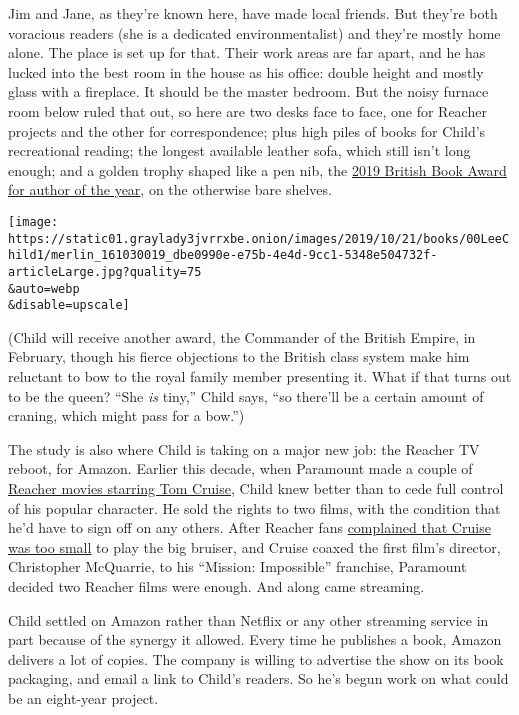 Jim and Jane, as they're known here, have made local friends. But
they're both voracious readers (she is a dedicated environmentalist) and
they're mostly home alone. The place is set up for that. Their work
areas are far apart, and he has lucked into the best room in the house
as his office: double height and mostly glass with a fireplace. It
should be the master bedroom. But the noisy furnace room below ruled
that out, so here are two desks face to face, one for Reacher projects
and the other for correspondence; plus high piles of books for Child's
recreational reading; the longest available leather sofa, which still
isn't long enough; and a golden trophy shaped like a pen nib, the
\href{https://www.thebookseller.com/british-book-awards/2019-author-year}{2019
British Book Award for author of the year}, on the otherwise bare
shelves.

\texttt{[image: https://static01.graylady3jvrrxbe.onion/images/2019/10/21/books/00LeeChild1/merlin\_161030019\_dbe0990e-e75b-4e4d-9cc1-5348e504732f-articleLarge.jpg?quality=75\\\&auto=webp\\\&disable=upscale]}

(Child will receive another award, the Commander of the British Empire,
in February, though his fierce objections to the British class system
make him reluctant to bow to the royal family member presenting it. What
if that turns out to be the queen? ``She \emph{is} tiny,'' Child says,
``so there'll be a certain amount of craning, which might pass for a
bow.'')

The study is also where Child is taking on a major new job: the Reacher
TV reboot, for Amazon. Earlier this decade, when Paramount made a couple
of
\href{https://www.nytimes3xbfgragh.onion/2012/12/21/movies/tom-cruise-in-jack-reacher.html}{Reacher
movies starring Tom Cruise}, Child knew better than to cede full control
of his popular character. He sold the rights to two films, with the
condition that he'd have to sign off on any others. After Reacher fans
\href{https://www.nytimes3xbfgragh.onion/2012/12/09/movies/tom-cruise-as-lee-childs-fictional-hero-in-jack-reacher.html}{complained
that Cruise was too small} to play the big bruiser, and Cruise coaxed
the first film's director, Christopher McQuarrie, to his ``Mission:
Impossible'' franchise, Paramount decided two Reacher films were enough.
And along came streaming.

Child settled on Amazon rather than Netflix or any other streaming
service in part because of the synergy it allowed. Every time he
publishes a book, Amazon delivers a lot of copies. The company is
willing to advertise the show on its book packaging, and email a link to
Child's readers. So he's begun work on what could be an eight-year
project.

